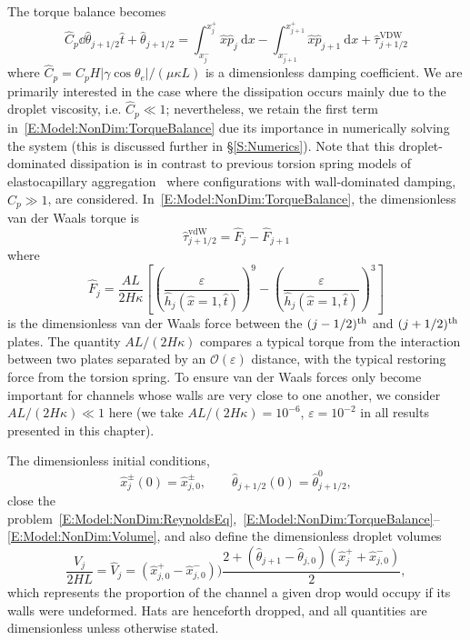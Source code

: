 The torque balance becomes
\begin{equation}\label{E:Model:NonDim:TorqueBalance}
\hat{C}_p\dd{\hat{\theta}_{j+1/2}}{\hat{t}} + \hat{\theta}_{j+1/2} = \int_{x_{j}^{-}}^{x_{j}^{+}}\hat{x}\hat{p}_j ~\mathrm{d}x - \int_{x_{j+1}^{-}}^{x_{j+1}^{+}}\hat{x}\hat{p}_{j+1} ~\mathrm{d}x + \hat{\tau}_{j+1/2}^{\text{VDW}}
\end{equation}
where $\hat{C}_p= C_p H |\gamma \cos \theta_e|/(\mu \kappa L)$ is a dimensionless damping coefficient. We are primarily interested in the case where the dissipation occurs mainly due to the droplet viscosity, i.e. $\hat{C}_p \ll 1$; nevertheless, we retain the first term in~\eqref{E:Model:NonDim:TorqueBalance} due its importance in numerically solving the system (this is discussed further in \S\ref{S:Numerics}).  Note that this droplet-dominated dissipation is in contrast to previous torsion spring models of elastocapillary aggregation~\citep{Wei2014EPL, Wei2015PRSA} where configurations with wall-dominated damping, $\hat{C}_p\gg 1$, are considered. In~\eqref{E:Model:NonDim:TorqueBalance}, the dimensionless van der Waals torque is
\begin{equation}
\hat{\tau}_{j+1/2}^{\text{vdW}} = \hat{F}_{j} - \hat{F}_{j+1}
\end{equation}
where
\begin{equation}
\hat{F}_{j} = \frac{AL}{2H \kappa}\left[\left(\frac{\varepsilon}{\hat{h}_j(\hat{x} = 1, \hat{t})}\right)^9 -\left(\frac{\varepsilon}{\hat{h}_j(\hat{x} = 1, \hat{t})}\right)^3 \right]
\end{equation}
is the dimensionless van der Waals force between the $(j-1/2)^{\text{th}}$ and $(j+1/2)^{\text{th}}$ plates. The quantity $AL/(2H\kappa)$ compares a typical torque from the interaction between two plates separated by an $\mathcal{O}(\varepsilon)$ distance, with the typical restoring force from the torsion spring. To ensure van der Waals forces only become important for channels whose walls are very close to one another, we consider $AL/(2H\kappa) \ll 1$ here (we take $AL/(2H\kappa) = 10^{-6}$, $\varepsilon = 10^{-2}$ in all results presented in this chapter).

The dimensionless initial conditions,
\begin{equation}\label{E:Model:NonDim:InitialConditions}
\hat{x}_{j}^{\pm}(0) = \hat{x}_{j, 0}^{\pm}, \qquad \hat{\theta}_{j+1/2}(0) = \hat{\theta}_{j+1/2}^0,
\end{equation}
close the problem~\eqref{E:Model:NonDim:ReynoldsEq},~\eqref{E:Model:NonDim:TorqueBalance}--\eqref{E:Model:NonDim:Volume}, and also define the dimensionless droplet volumes
\begin{equation}\label{E:Model:NonDim:Volume}
\frac{V_j}{2HL} = \hat{V}_j = \left(\hat{x}_{j,0}^+ -\hat{x}_{j,0}^-\right))\frac{2 + \left(\hat{\theta}_{j+1}-\hat{\theta}_{j,0}\right) \left(\hat{x}_j^+ + \hat{x}_{j,0}^-\right)}{2},
\end{equation}
which represents the proportion of the channel a given drop would occupy if its walls were undeformed. Hats are henceforth dropped, and all quantities are dimensionless unless otherwise stated.

